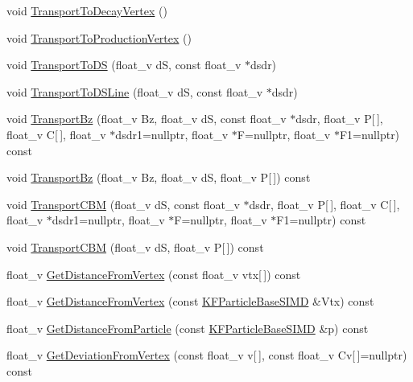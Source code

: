 \begin{DoxyCompactItemize}
void \hyperlink{classKFParticleBaseSIMD_a1163dac578cd40f360f1778ceb880035}{Transport\+To\+Decay\+Vertex} ()
\item 
void \hyperlink{classKFParticleBaseSIMD_a0a6f09356d3e2a3cfdc3637090ed10dd}{Transport\+To\+Production\+Vertex} ()
\item 
void \hyperlink{classKFParticleBaseSIMD_ae4bd5b9ffbeb8b5f9595cf6d34592c31}{Transport\+To\+DS} (float\+\_\+v dS, const float\+\_\+v $\ast$dsdr)
\item 
void \hyperlink{classKFParticleBaseSIMD_a01255a2f9bd979672aa08041cf2b34a4}{Transport\+To\+D\+S\+Line} (float\+\_\+v dS, const float\+\_\+v $\ast$dsdr)
\item 
void \hyperlink{classKFParticleBaseSIMD_a4acde83e522366bef474e49f7f2509c7}{Transport\+Bz} (float\+\_\+v Bz, float\+\_\+v dS, const float\+\_\+v $\ast$dsdr, float\+\_\+v P\mbox{[}$\,$\mbox{]}, float\+\_\+v C\mbox{[}$\,$\mbox{]}, float\+\_\+v $\ast$dsdr1=nullptr, float\+\_\+v $\ast$F=nullptr, float\+\_\+v $\ast$F1=nullptr) const 
\item 
void \hyperlink{classKFParticleBaseSIMD_acb05aa525f9794f635fc113dc724548d}{Transport\+Bz} (float\+\_\+v Bz, float\+\_\+v dS, float\+\_\+v P\mbox{[}$\,$\mbox{]}) const 
\item 
void \hyperlink{classKFParticleBaseSIMD_a0fb8ef971518781a8205d08220159321}{Transport\+C\+BM} (float\+\_\+v dS, const float\+\_\+v $\ast$dsdr, float\+\_\+v P\mbox{[}$\,$\mbox{]}, float\+\_\+v C\mbox{[}$\,$\mbox{]}, float\+\_\+v $\ast$dsdr1=nullptr, float\+\_\+v $\ast$F=nullptr, float\+\_\+v $\ast$F1=nullptr) const 
\item 
void \hyperlink{classKFParticleBaseSIMD_a314c83fd7be746bebb954e1a558faa12}{Transport\+C\+BM} (float\+\_\+v dS, float\+\_\+v P\mbox{[}$\,$\mbox{]}) const 
\item 
float\+\_\+v \hyperlink{classKFParticleBaseSIMD_adfb65cfc48f2e66e3a1cb55c85c5b53e}{Get\+Distance\+From\+Vertex} (const float\+\_\+v vtx\mbox{[}$\,$\mbox{]}) const 
\item 
float\+\_\+v \hyperlink{classKFParticleBaseSIMD_a63ace5a90b37dd5271b33d4b6a5e63a6}{Get\+Distance\+From\+Vertex} (const \hyperlink{classKFParticleBaseSIMD}{K\+F\+Particle\+Base\+S\+I\+MD} \&Vtx) const 
\item 
float\+\_\+v \hyperlink{classKFParticleBaseSIMD_a7c0a29adffcefb49d4b3ccb2d8ffc1d3}{Get\+Distance\+From\+Particle} (const \hyperlink{classKFParticleBaseSIMD}{K\+F\+Particle\+Base\+S\+I\+MD} \&p) const 
\item 
float\+\_\+v \hyperlink{classKFParticleBaseSIMD_af290fc3494b3a4cf039a322b85d2170c}{Get\+Deviation\+From\+Vertex} (const float\+\_\+v v\mbox{[}$\,$\mbox{]}, const float\+\_\+v Cv\mbox{[}$\,$\mbox{]}=nullptr) const 

\end{DoxyCompactItemize}
